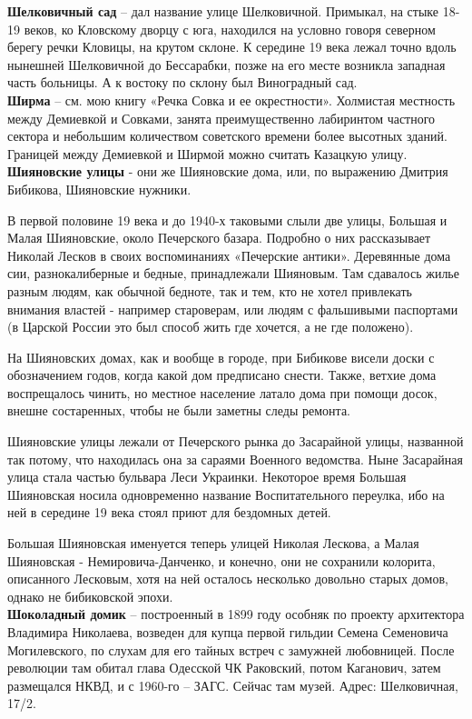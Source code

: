 \textbf{Шелковичный сад} – дал название улице Шелковичной. Примыкал, на стыке 18-19 веков, ко Кловскому дворцу с юга, находился на условно говоря северном берегу речки Кловицы, на крутом склоне. К середине 19 века лежал точно вдоль нынешней Шелковичной до Бессарабки, позже на его месте возникла западная часть больницы. А к востоку по склону был Виноградный сад.\\

\textbf{Ширма} – см. мою книгу «Речка Совка и ее окрестности». Холмистая местность между Демиевкой и Совками, занята преимущественно лабиринтом частного сектора и небольшим количеством советского времени более высотных зданий. Границей между Демиевкой и Ширмой можно считать Казацкую улицу.\\

\textbf{Шияновские улицы} - они же Шияновские дома, или, по выражению Дмитрия Бибикова, Шияновские нужники.

В первой половине 19 века и до 1940-х таковыми слыли две улицы, Большая и Малая Шияновские, около Печерского базара. Подробно о них рассказывает Николай Лесков в своих воспоминаниях «Печерские антики». Деревянные дома сии, разнокалиберные и бедные, принадлежали Шияновым. Там сдавалось жилье разным людям, как обычной бедноте, так и тем, кто не хотел привлекать внимания властей - например староверам, или людям с фальшивыми паспортами (в Царской России это был способ жить где хочется, а не где положено).

На Шияновских домах, как и вообще в городе, при Бибикове висели доски с обозначением годов, когда какой дом предписано снести. Также, ветхие дома воспрещалось чинить, но местное население латало дома при помощи досок, внешне состаренных, чтобы не были заметны следы ремонта.

Шияновские улицы лежали от Печерского рынка до Засарайной улицы, названной так потому, что находилась она за сараями Военного ведомства. Ныне Засарайная улица стала частью бульвара Леси Украинки. Некоторое время Большая Шияновская носила одновременно название Воспитательного переулка, ибо на ней в середине 19 века стоял приют для бездомных детей.

Большая Шияновская именуется теперь улицей Николая Лескова, а Малая Шияновская - Немировича-Данченко, и конечно, они не сохранили колорита, описанного Лесковым, хотя на ней осталось несколько довольно старых домов, однако не бибиковской эпохи.\\

\textbf{Шоколадный домик} – построенный в 1899 году особняк по проекту архитектора Владимира Николаева, возведен для купца первой гильдии Семена Семеновича Могилевского, по слухам для его тайных встреч с замужней любовницей. После революции там обитал глава Одесской ЧК Раковский, потом Каганович, затем размещался НКВД, и с 1960-го – ЗАГС. Сейчас там музей. Адрес: Шелковичная, 17/2.\\

